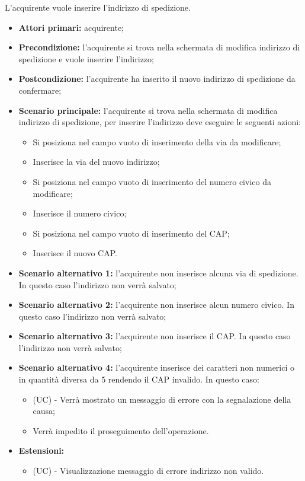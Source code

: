 L'acquirente vuole inserire l'indirizzo di spedizione.
\begin{itemize}
    \item \textbf{Attori primari:} acquirente;
    \item \textbf{Precondizione:} l'acquirente si trova nella schermata di modifica indirizzo di spedizione e vuole inserire l'indirizzo;
    \item \textbf{Postcondizione:} l'acquirente ha inserito il nuovo indirizzo di spedizione da confermare;
    \item \textbf{Scenario principale:} l'acquirente si trova nella schermata di modifica indirizzo di spedizione, per inserire l'indirizzo deve eseguire le seguenti azioni:
        \begin{itemize}
            \item Si posiziona nel campo vuoto di inserimento della via da modificare;
            \item Inserisce la via del nuovo indirizzo;
            \item Si posiziona nel campo vuoto di inserimento del numero civico da modificare;
            \item Inserisce il numero civico;
            \item Si posiziona nel campo vuoto di inserimento del CAP;
            \item Inserisce il nuovo CAP.
        \end{itemize}
    \item \textbf{Scenario alternativo 1:} l'acquirente non inserisce alcuna via di spedizione. In questo caso l'indirizzo non verrà salvato;
    \item \textbf{Scenario alternativo 2:} l'acquirente non inserisce alcun numero civico. In questo caso l'indirizzo non verrà salvato;
    \item \textbf{Scenario alternativo 3:} l'acquirente non inserisce il CAP. In questo caso l'indirizzo non verrà salvato;
    \item \textbf{Scenario alternativo 4:} l'acquirente inserisce dei caratteri non numerici o in quantità diversa da 5 rendendo il CAP invalido. In questo caso:
    \begin{itemize}
        \item (UC) - Verrà mostrato un messaggio di errore con la segnalazione della causa;
        \item Verrà impedito il proseguimento dell'operazione.
    \end{itemize}
    \item \textbf{Estensioni:}
    \begin{itemize}
        \item (UC) - Visualizzazione messaggio di errore  indirizzo non valido.
    \end{itemize}
\end{itemize}

